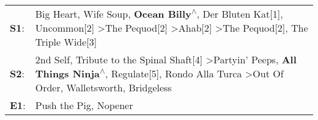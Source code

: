 \begin{supertabular}{p{0.03\textwidth}p{0.92\textwidth}}
 \textbf{S1}:  &           Big Heart\textsuperscript{}, \enspace Wife Soup\textsuperscript{}, \enspace \textbf{Ocean Billy\textsuperscript{$\wedge$}}, \enspace Der Bluten Kat[1]\textsuperscript{}, \enspace Uncommon[2]\textsuperscript{} \textgreater \enspace The Pequod[2]\textsuperscript{} \textgreater \enspace Ahab[2]\textsuperscript{} \textgreater \enspace The Pequod[2]\textsuperscript{}, \enspace The Triple Wide[3]\textsuperscript{}  \enspace  \\
 \textbf{S2}:  &  2nd Self\textsuperscript{}, \enspace Tribute to the Spinal Shaft[4]\textsuperscript{} \textgreater \enspace Partyin' Peeps\textsuperscript{}, \enspace \textbf{All Things Ninja\textsuperscript{$\wedge$}}, \enspace Regulate[5]\textsuperscript{}, \enspace Rondo Alla Turca\textsuperscript{} \textgreater \enspace Out Of Order\textsuperscript{}, \enspace Walletsworth\textsuperscript{}, \enspace Bridgeless\textsuperscript{}  \enspace  \\
 \textbf{E1}:  &                                                                                                                                                                                                                                                                                                                                                                    Push the Pig\textsuperscript{}, \enspace Nopener\textsuperscript{}  \enspace  \\
\end{supertabular}
